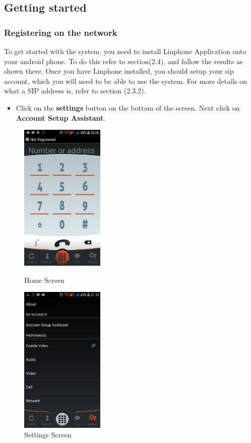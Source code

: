 \documentclass[a4paper]{article}
\begin{document}
\subsection{Getting started}
\subsubsection{Registering on the network}
To get started with the system, you need to install Linphone Application onto your android phone. To do this refer to section(2.4), and follow the results as shown there.
Once you have Linphone installed, you should setup your sip account, which you will need to be able to use the system. For more details on what a SIP address is, refer to section (2.3.2).
\begin{itemize}
\item Click on the \textbf{settings} button on the bottom of the screen. Next click on  \textbf{Account Setup Assistant}.
\end{itemize}

\begin{figure}[h]
  \centering
  \begin{minipage}[h]{0.4\textwidth}
    \includegraphics[width=40mm, scale=0.5]{pictures/home.png}
    \caption{Home Screen}
  \end{minipage}
  \hfill
  \begin{minipage}[h]{0.4\textwidth}
    \includegraphics[width=40mm, scale=0.5]{pictures/settings.png}
    \caption{Settings Screen}
  \end{minipage}
\end{figure}
\end{document}
